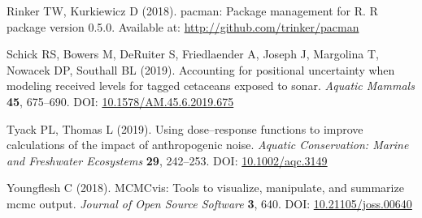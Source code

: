 \documentclass[
]{article}
\begin{document}
\leavevmode\hypertarget{ref-Rinker2018}{}%
Rinker TW, Kurkiewicz D (2018). pacman: Package management for R. R package version 0.5.0. Available at: \url{http://github.com/trinker/pacman}

\leavevmode\hypertarget{ref-Schick2019}{}%
Schick RS, Bowers M, DeRuiter S, Friedlaender A, Joseph J, Margolina T, Nowacek DP, Southall BL (2019). Accounting for positional uncertainty when modeling received levels for tagged cetaceans exposed to sonar. \emph{Aquatic Mammals} \textbf{45}, 675--690. DOI: \href{https://doi.org/10.1578/AM.45.6.2019.675}{10.1578/AM.45.6.2019.675}

\leavevmode\hypertarget{ref-Tyack2019}{}%
Tyack PL, Thomas L (2019). Using dose--response functions to improve calculations of the impact of anthropogenic noise. \emph{Aquatic Conservation: Marine and Freshwater Ecosystems} \textbf{29}, 242--253. DOI: \href{https://doi.org/10.1002/aqc.3149}{10.1002/aqc.3149}

\leavevmode\hypertarget{ref-Youngflesh2018}{}%
Youngflesh C (2018). MCMCvis: Tools to visualize, manipulate, and summarize mcmc output. \emph{Journal of Open Source Software} \textbf{3}, 640. DOI: \href{https://doi.org/10.21105/joss.00640}{10.21105/joss.00640}
\end{document}
